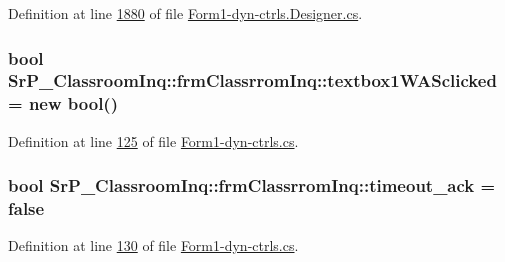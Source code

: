 \-Definition at line \hyperlink{_form1-dyn-ctrls_8_designer_8cs_source_l01880}{1880} of file \hyperlink{_form1-dyn-ctrls_8_designer_8cs_source}{\-Form1-\/dyn-\/ctrls.\-Designer.\-cs}.

\hypertarget{class_sr_p___classroom_inq_1_1frm_classrrom_inq_a998e499144884577e3445f4b721b4c6a}{
\subsubsection[{textbox1\-W\-A\-Sclicked}]{\setlength{\rightskip}{0pt plus 5cm}bool {\bf \-Sr\-P\-\_\-\-Classroom\-Inq\-::frm\-Classrrom\-Inq\-::textbox1\-W\-A\-Sclicked} = new bool()}}
\label{class_sr_p___classroom_inq_1_1frm_classrrom_inq_a998e499144884577e3445f4b721b4c6a}


\-Definition at line \hyperlink{_form1-dyn-ctrls_8cs_source_l00125}{125} of file \hyperlink{_form1-dyn-ctrls_8cs_source}{\-Form1-\/dyn-\/ctrls.\-cs}.

\hypertarget{class_sr_p___classroom_inq_1_1frm_classrrom_inq_a64cde7d8ac96b5122de783724c58103a}{
\subsubsection[{timeout\-\_\-ack}]{\setlength{\rightskip}{0pt plus 5cm}bool {\bf \-Sr\-P\-\_\-\-Classroom\-Inq\-::frm\-Classrrom\-Inq\-::timeout\-\_\-ack} = false}}
\label{class_sr_p___classroom_inq_1_1frm_classrrom_inq_a64cde7d8ac96b5122de783724c58103a}


\-Definition at line \hyperlink{_form1-dyn-ctrls_8cs_source_l00130}{130} of file \hyperlink{_form1-dyn-ctrls_8cs_source}{\-Form1-\/dyn-\/ctrls.\-cs}.

